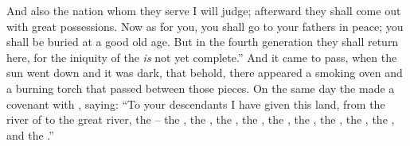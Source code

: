 \bverse And also the nation whom they serve I will judge; afterward they shall come out with great possessions.
\bverse Now as for you, you shall go to your fathers in peace; you shall be buried at a good old age.
\bverse But in the fourth generation they shall return here, for the iniquity of the  \textit{is} not yet complete.''
\bverse And it came to pass, when the sun went down and it was dark, that behold, there appeared a smoking oven and a burning torch that passed between those pieces.
\bverse On the same day the \lord made a covenant with , saying:
\bverse ``To your descendants I have given this land, from the river of \Egypt to the great river, the --
\bverse the , the , the ,
\bverse the , the , the , the , the , the , and the .''
